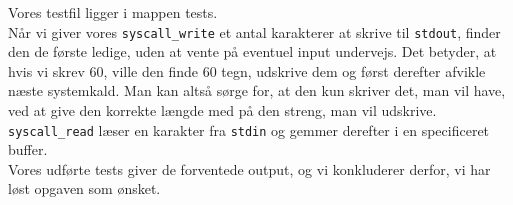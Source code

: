 Vores testfil ligger i mappen tests.\\

\noindent Når vi giver vores \verb+syscall_write+ et antal karakterer at skrive til \verb+stdout+, finder den
de første ledige, uden at vente på eventuel input undervejs. Det betyder, at hvis vi skrev 60, ville den 
finde 60 tegn, udskrive dem og først derefter afvikle næste systemkald. Man kan altså sørge for, at den 
kun skriver det, man vil have, ved at give den korrekte længde med på den streng, man vil udskrive.\\

\noindent \verb+syscall_read+ læser en karakter fra \verb+stdin+ og gemmer derefter i en specificeret 
buffer. \\

\noindent Vores udførte tests giver de forventede output, og vi konkluderer derfor, vi har løst opgaven som 
ønsket. 